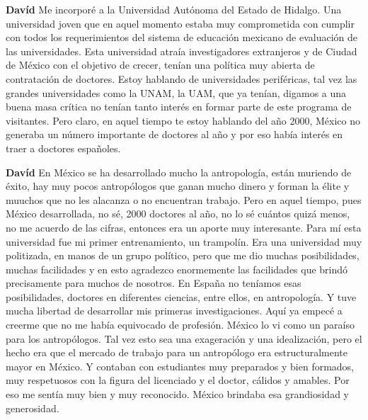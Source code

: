 \documentclass[
  spanish,
  11pt,
  a4paper,
]{scrbook}
\newenvironment{transcripcion}{
    \begin{list}{}{
        \setlength{\leftmargin}{1.5em}  %
        \setlength{\rightmargin}{0em}
        \setlength{\itemsep}{0.2em}     %
        \setlength{\parsep}{0.0em}
        \setlength{\listparindent}{0pt}
    }
}{
    \end{list}
}
\newcommand{\personaje}[1]{\textbf{#1}\quad}
\begin{document}
\begin{transcripcion}
\item \personaje{Davíd} Me incorporé a la Universidad Autónoma del Estado de Hidalgo. Una universidad joven que en aquel momento estaba muy comprometida con cumplir con todos los requerimientos del sistema de educación mexicano de evaluación de las universidades. Esta universidad atraía investigadores extranjeros y de Ciudad de México con el objetivo de crecer, tenían una política muy abierta de contratación de doctores. Estoy hablando de universidades periféricas, tal vez las grandes universidades como la UNAM, la UAM, que ya tenían, digamos a una buena masa crítica no tenían tanto interés en formar parte de este programa de visitantes. Pero claro, en aquel tiempo te estoy hablando del año 2000, México no generaba un número importante de doctores al año y por eso había interés en traer a doctores españoles.

\item \personaje{Davíd} En México se ha desarrollado mucho la antropología, están muriendo de éxito, hay muy pocos antropólogos que ganan mucho dinero y forman la élite y muuchos que no les alacanza o no encuentran trabajo. Pero en aquel tiempo, pues México desarrollada, no sé, 2000 doctores al año, no lo sé cuántos quizá menos, no me acuerdo de las cifras, entonces era un aporte muy interesante. Para mí esta universidad fue mi primer entrenamiento, un trampolín. Era una universidad muy politizada, en manos de un grupo político, pero que me dio muchas posibilidades, muchas facilidades y en esto agradezco enormemente las facilidades que brindó precisamente para muchos de nosotros. En España no teníamos esas posibilidades, doctores en diferentes ciencias, entre ellos, en antropología. Y tuve mucha libertad de desarrollar mis primeras investigaciones. Aquí ya empecé a creerme que no me había equivocado de profesión. México lo vi como un paraíso para los antropólogos. Tal vez esto sea una exageración y una idealización, pero el hecho era que el mercado de trabajo para un antropólogo era estructuralmente mayor en México. Y contaban con estudiantes muy preparados y bien formados, muy respetuosos con la figura del licenciado y el doctor, cálidos y amables. Por eso me sentía muy bien y muy reconocido. México brindaba esa grandiosidad y generosidad.


\end{transcripcion}
\end{document}
